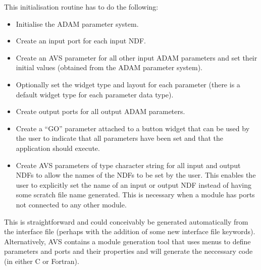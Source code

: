 This initialisation routine has to do the following:
\begin{itemize}

\item Initialise the ADAM parameter system.

\item Create an input port for each input NDF.

\item Create an AVS parameter for all other input ADAM parameters and set their
  initial values (obtained from the ADAM parameter system).

\item Optionally set the widget type and layout for each parameter (there is a
  default widget type for each parameter data type).

\item Create output ports for all output ADAM parameters.

\item Create a ``GO'' parameter attached to a button widget that can be used by the
  user to indicate that all parameters have been set and that the application
  should execute.

\item Create AVS parameters of type character string for all input and output NDFs
  to allow the names of the NDFs to be set by the user. This enables the user
  to explicitly set the name of an input or output NDF instead of having some
  scratch file name generated. This is necessary when a module has ports not 
  connected to any other module.

\end{itemize}
This is straightforward and could conceivably be generated automatically from
the interface file (perhaps with the addition of some new interface file
keywords). Alternatively, AVS contains a module generation tool that uses menus
to define parameters and ports and their properties and will generate the
neccessary code (in either C or Fortran).      

